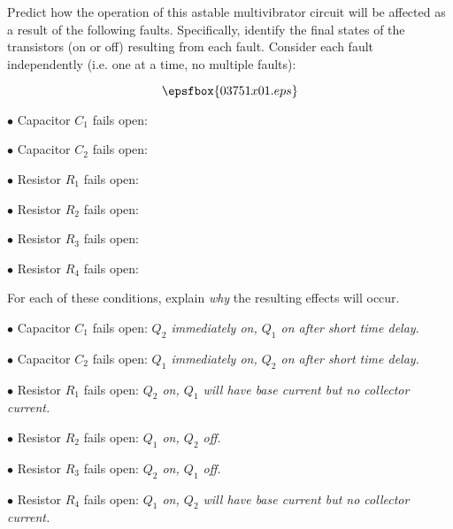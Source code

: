 

Predict how the operation of this astable multivibrator circuit will be affected as a result of the following faults.  Specifically, identify the final states of the transistors (on or off) resulting from each fault.  Consider each fault independently (i.e. one at a time, no multiple faults):

$$\epsfbox{03751x01.eps}$$

\medskip
\item{$\bullet$} Capacitor $C_1$ fails open:
\vskip 5pt
\item{$\bullet$} Capacitor $C_2$ fails open:
\vskip 5pt
\item{$\bullet$} Resistor $R_1$ fails open:
\vskip 5pt
\item{$\bullet$} Resistor $R_2$ fails open:
\vskip 5pt
\item{$\bullet$} Resistor $R_3$ fails open:
\vskip 5pt
\item{$\bullet$} Resistor $R_4$ fails open:
\medskip

For each of these conditions, explain {\it why} the resulting effects will occur.







\medskip
\item{$\bullet$} Capacitor $C_1$ fails open: {\it $Q_2$ immediately on, $Q_1$ on after short time delay.}
\vskip 5pt
\item{$\bullet$} Capacitor $C_2$ fails open: {\it $Q_1$ immediately on, $Q_2$ on after short time delay.}
\vskip 5pt
\item{$\bullet$} Resistor $R_1$ fails open: {\it $Q_2$ on, $Q_1$ will have base current but no collector current.}
\vskip 5pt
\item{$\bullet$} Resistor $R_2$ fails open: {\it $Q_1$ on, $Q_2$ off.}
\vskip 5pt
\item{$\bullet$} Resistor $R_3$ fails open: {\it $Q_2$ on, $Q_1$ off.}
\vskip 5pt
\item{$\bullet$} Resistor $R_4$ fails open: {\it $Q_1$ on, $Q_2$ will have base current but no collector current.}
\medskip






